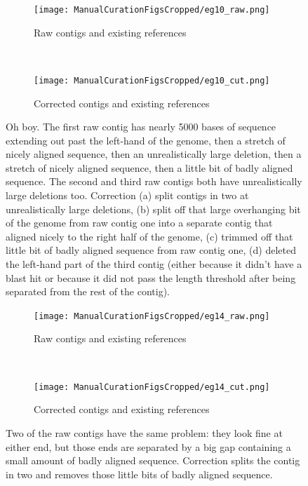 \documentclass{article}
\begin{document}
\begin{landscape}
\begin{figure}[!h]
\centering
\begin{subfigure}{1.3\textwidth}
\texttt{[image: ManualCurationFigsCropped/eg10\_raw.png]}
\caption{Raw contigs and existing references}
\end{subfigure}
\vspace*{1cm} \\
\begin{subfigure}{1.3\textwidth}
\texttt{[image: ManualCurationFigsCropped/eg10\_cut.png]}
\caption{Corrected contigs and existing references}
\end{subfigure}
\caption{Oh boy.
The first raw contig has nearly 5000 bases of sequence extending out past the left-hand of the genome, then a stretch of nicely aligned sequence, then an unrealistically large deletion, then a stretch of nicely aligned sequence, then a little bit of badly aligned sequence.
The second and third raw contigs both have unrealistically large deletions too.
Correction (a) split contigs in two at unrealistically large deletions, (b) split off that large overhanging bit of the genome from raw contig one into a separate contig that aligned nicely to the right half of the genome, (c) trimmed off that little bit of badly aligned sequence from raw contig one, (d) deleted the left-hand part of the third contig (either because it didn't have a blast hit or because it did not pass the length threshold after being separated from the rest of the contig).}
\end{figure}

\begin{figure}[!h]
\centering
\begin{subfigure}{1.3\textwidth}
\texttt{[image: ManualCurationFigsCropped/eg14\_raw.png]}
\caption{Raw contigs and existing references}
\end{subfigure}
\vspace*{1cm} \\
\begin{subfigure}{1.3\textwidth}
\texttt{[image: ManualCurationFigsCropped/eg14\_cut.png]}
\caption{Corrected contigs and existing references}
\end{subfigure}
\caption{Two of the raw contigs have the same problem: they look fine at either end, but those ends are separated by a big gap containing a small amount of badly aligned sequence.
Correction splits the contig in two and removes those little bits of badly aligned sequence.}
\end{figure}


\end{landscape}
\end{document}
